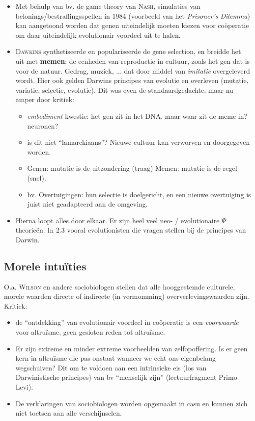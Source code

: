 \documentclass[11pt,a4paper]{article}
\begin{document}
\begin{itemize}

\item Met behulp van bv. de game theory van \textsc{Nash}, simulaties van belonings/bestraffingsspellen in 1984 (voorbeeld van het \emph{Prisoner's Dilemma}) kan aangetoond worden dat genen uiteindelijk moeten kiezen voor co\"operatie om daar uiteindelijk evolutionair voordeel uit te halen.

\item \textsc{Dawkins} synthetiseerde en populariseerde de gene selection, en breidde het uit met \textbf{memen}: de eenheden van reproductie in cultuur, zoals het gen dat is voor de natuur. Gedrag, muziek, ... dat door middel van \emph{imitatie} overgeleverd wordt. Hier ook gelden Darwins principes van evolutie en overleven (mutatie, variatie, selectie, evolutie). Dit was even de standaardgedachte, maar nu amper door kritiek:
	\begin{itemize}
	\item \emph{embodiment} kwestie: het gen zit in het DNA, maar waar zit de meme in? neuronen?
	\item is dit niet ``lamarckiaans''? Nieuwe cultuur kan verworven en doorgegeven worden.
	\item Genen: mutatie is de uitzondering (traag) Memen: mutatie is de regel (snel).
	\item bv. Overtuigingen: hun selectie is doelgericht, en een nieuwe overtuiging is juist niet geadapteerd aan de omgeving.
	\end{itemize}
\item Hierna loopt alles door elkaar. Er zijn heel veel neo- / evolutionaire $\Psi$ theorie\"en. In 2.3 vooral evolutionisten die vragen stellen bij de principes van Darwin.
\end{itemize}


\subsection{Morele intu\"ities}
O.a. \textsc{Wilson} en andere sociobiologen stellen dat alle hooggestemde culturele, morele waarden directe of indirecte (in vermomming) oververlevingswaarden zijn. Kritiek:
\begin{itemize}
\item de ``ontdekking'' van evolutionair voordeel in co\"operatie is een \emph{voorwaarde} voor altru\"isme, geen gesloten reden tot altru\"isme.
\item Er zijn extreme en minder extreme voorbeelden van zelfopoffering. Is er geen kern in altru\"isme die pas onstaat wanneer we echt ons eigenbelang wegschuiven? Dit om te voldoen aan een intrinsieke eis (los van Darwinistische principes) van bv ``menselijk zijn'' (lectuurfragment Primo Levi). 
\item De verklaringen van sociobiologen worden opgemaakt in casu en kunnen zich niet toetsen aan alle verschijnselen.
\end{itemize}
\end{document}
